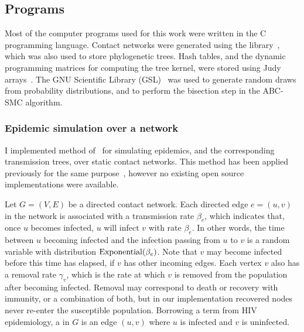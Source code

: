 \subsection{Programs}

Most of the computer programs used for this work were written in the C
programming language. Contact networks were generated using the
 library~\autocite{csardi2006igraph}, which was also used to
store phylogenetic trees. Hash tables, and the dynamic programming matrices for
computing the tree kernel, were stored using Judy
arrays~\autocite{baskins2004judy}. The GNU Scientific Library
(GSL)~\autocite{gough2009gnu} was used to generate random draws from
probability distributions, and to perform the bisection step in the ABC-SMC
algorithm.

\subsubsection{Epidemic simulation over a network}

I implemented method of~\autocite{gillespie1977exact} for simulating epidemics,
and the corresponding transmission trees, over static contact networks. This
method has been applied previously for the same
purpose~\autocite{robinson2013dynamics, leventhal2012inferring}, however no
existing open source implementations were available.

Let $G = (V, E)$ be a directed contact network. Each directed edge $e = (u, v)$
in the network is associated with a transmission rate $\beta_e$, which indicates
that, once $u$ becomes infected, $u$ will infect $v$ with rate $\beta_e$. In
other words, the time between $u$ becoming infected and the infection passing
from $u$ to $v$ is a random variable with distribution $\operatorname{Exponential}(\beta_e)$.
Note that $v$ may become infected before this time has elapsed, if $v$ has
other incoming edges. Each vertex $v$ also has a removal rate $\gamma_v$, which
is the rate at which $v$ is removed from the population after becoming
infected. Removal may correspond to death or recovery with immunity, or a
combination of both, but in our implementation recovered nodes never re-enter
the susceptible population. Borrowing a term from HIV epidemiology, a
 in $G$ is an edge $(u, v)$ where $u$ is infected and $v$
is uninfected. 

